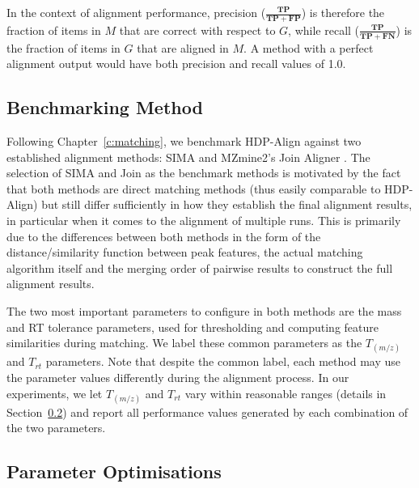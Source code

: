 In the context of alignment performance, precision ($\frac{\boldsymbol{TP}}{\boldsymbol{TP}+\boldsymbol{FP}}$) is therefore the fraction of items in $M$ that are correct with respect to $G$, while recall ($\frac{\boldsymbol{TP}}{\boldsymbol{TP}+\boldsymbol{FN}}$) is the fraction of items in $G$ that are aligned in $M$. A method with a perfect alignment output would have both precision and recall values of 1.0. 

\subsection{Benchmarking Method}

Following Chapter~\ref{c:matching}, we benchmark HDP-Align against two established alignment methods: SIMA \cite{Voss2011a} and MZmine2's Join Aligner \cite{Pluskal2010}. The selection of SIMA and Join as the benchmark methods is motivated by the fact that both methods are direct matching methods (thus easily comparable to HDP-Align) but still differ sufficiently in how they establish the final alignment results, in particular when it comes to the alignment of multiple runs. This is primarily due to the differences between both methods in the form of the distance/similarity function between peak features, the actual matching algorithm itself and the merging order of pairwise results to construct the full alignment results.

The two most important parameters to configure in both methods are the mass and \ac{RT} tolerance parameters, used for thresholding and computing feature similarities during matching. We label these common parameters as the $T_{(m/z)}$ and $T_{rt}$ parameters. Note that despite the common label, each method may use the parameter values differently during the alignment process. In our experiments, we let $T_{(m/z)}$ and $T_{rt}$ vary within reasonable ranges (details in Section~\ref{sub:parameter-optimisations}) and report all performance values generated by each combination of the two parameters.

\subsection{Parameter Optimisations}
\label{sub:parameter-optimisations}

